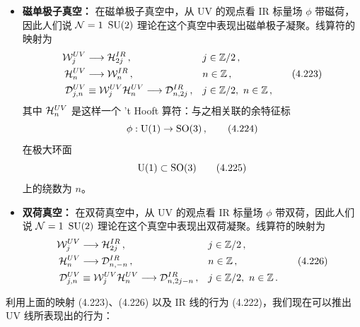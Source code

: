 

\begin{itemize}[leftmargin=1.4em,itemsep=4pt,topsep=1pt]
\item \textbf{磁单极子真空：} 在磁单极子真空中，从 UV 的观点看 IR 标量场 $\phi$ 带磁荷，因此人们说 $\mathcal{N}=1$ $\mathrm{SU}(2)$ 理论在这个真空中表现出磁单极子凝聚。线算符的映射为
\begin{equation}
\begin{aligned}
  \mathcal{W}^{UV}_j&\longrightarrow\mathcal{H}^{IR}_{2j}\,, && j\in\mathbb{Z}/2\,,\\
  \mathcal{H}^{UV}_n&\longrightarrow\mathcal{W}^{IR}_n\,, && n\in\mathbb{Z}\,,\\
  \mathcal{D}^{UV}_{j,n}&\equiv\mathcal{W}^{UV}_j\mathcal{H}^{UV}_n\longrightarrow\mathcal{D}^{IR}_{n,2j}\,, && j\in\mathbb{Z}/2,\ n\in\mathbb{Z}\,,
\end{aligned}
\tag{4.223}
\end{equation}
其中 $\mathcal{H}^{UV}_n$ 是这样一个 't Hooft 算符：与之相关联的余特征标
\begin{equation}
  \phi:\mathrm{U}(1)\to\mathrm{SO}(3)\,, \tag{4.224}
\end{equation}
在极大环面
\begin{equation}
  \mathrm{U}(1)\subset\mathrm{SO}(3) \tag{4.225}
\end{equation}
上的绕数为 $n$。
\item \textbf{双荷真空：} 在双荷真空中，从 UV 的观点看 IR 标量场 $\phi$ 带双荷，因此人们说 $\mathcal{N}=1$ $\mathrm{SU}(2)$ 理论在这个真空中表现出双荷凝聚。线算符的映射为
\begin{equation}
\begin{aligned}
  \mathcal{W}^{UV}_j&\longrightarrow\mathcal{H}^{IR}_{2j}\,, && j\in\mathbb{Z}/2\,,\\
  \mathcal{H}^{UV}_n&\longrightarrow\mathcal{D}^{IR}_{n,-n}\,, && n\in\mathbb{Z}\,,\\
  \mathcal{D}^{UV}_{j,n}&\equiv\mathcal{W}^{UV}_j\mathcal{H}^{UV}_n\longrightarrow\mathcal{D}^{IR}_{n,2j-n}\,, && j\in\mathbb{Z}/2,\ n\in\mathbb{Z}\,.
\end{aligned}
\tag{4.226}
\end{equation}
\end{itemize}


利用上面的映射 (4.223)、(4.226) 以及 IR 线的行为 (4.222)，我们现在可以推出 UV 线所表现出的行为：

